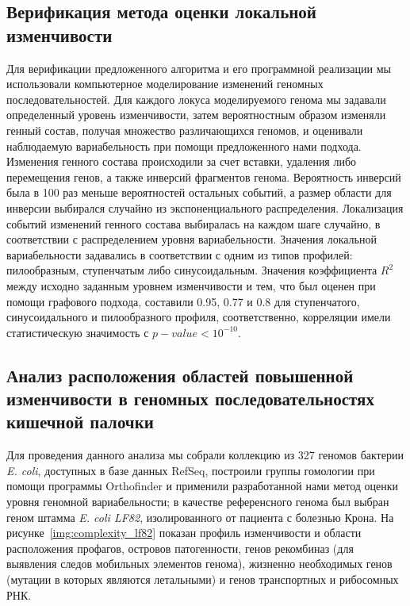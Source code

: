 \subsection*{Верификация метода оценки локальной изменчивости}
Для верификации предложенного алгоритма и его программной реализации мы использовали компьютерное моделирование изменений геномных последовательностей. Для каждого локуса моделируемого генома мы задавали определенный уровень изменчивости, затем вероятностным образом изменяли генный состав, получая множество различающихся геномов, и оценивали наблюдаемую вариабельность при помощи предложенного нами подхода. Изменения генного состава происходили за счет вставки, удаления либо перемещения генов, а также инверсий фрагментов генома. Вероятность инверсий была в 100 раз меньше вероятностей остальных событий, а размер области для инверсии выбирался случайно из экспоненциального распределения. Локализация событий изменений генного состава выбиралась на каждом шаге случайно, в соответствии с распределением уровня вариабельности. Значения локальной вариабельности задавались в соответствии с одним из типов профилей: пилообразным, ступенчатым либо синусоидальным. Значения коэффициента $R^2$ между исходно заданным уровнем изменчивости и тем, что был оценен при помощи графового подхода, составили 0.95, 0.77 и 0.8 для ступенчатого, синусоидального и пилообразного профиля, соответственно, корреляции имели статистическую значимость с ${p-value < 10^{-10} }$.

\subsection*{Анализ расположения областей повышенной изменчивости в геномных последовательностях кишечной палочки}
Для проведения данного анализа мы собрали коллекцию из 327 геномов бактерии \textit{E. coli}, доступных в базе данных RefSeq, построили группы гомологии при помощи программы Orthofinder и применили разработанной нами метод оценки уровня геномной вариабельности; в качестве референсного генома был выбран геном штамма \textit{E. coli LF82}, изолированного от пациента с болезнью Крона. На рисунке~\ref{img:complexity_lf82} показан профиль изменчивости и области расположения профагов, островов патогенности, генов рекомбиназ (для выявления следов мобильных элементов генома), жизненно необходимых генов (мутации в которых являются летальными) и генов транспортных и рибосомных РНК.

